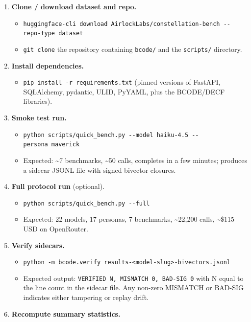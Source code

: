 \documentclass{article}
\providecommand{\tightlist}{\setlength{\itemsep}{0pt}\setlength{\parskip}{0pt}}
\begin{document}
\begin{enumerate}
\def\labelenumi{\arabic{enumi}.}
\tightlist
\item
  \textbf{Clone / download dataset and repo.}

  \begin{itemize}
  \tightlist
  \item
    \texttt{huggingface-cli\ download\ AirlockLabs/constellation-bench\ -\/-repo-type\ dataset}
  \item
    \texttt{git\ clone} the repository containing \texttt{bcode/} and
    the \texttt{scripts/} directory.
  \end{itemize}
\item
  \textbf{Install dependencies.}

  \begin{itemize}
  \tightlist
  \item
    \texttt{pip\ install\ -r\ requirements.txt} (pinned versions of
    FastAPI, SQLAlchemy, pydantic, ULID, PyYAML, plus the BCODE/DECF
    libraries).
  \end{itemize}
\item
  \textbf{Smoke test run.}

  \begin{itemize}
  \tightlist
  \item
    \texttt{python\ scripts/quick\_bench.py\ -\/-model\ haiku-4.5\ -\/-persona\ maverick}
  \item
    Expected: \textasciitilde7 benchmarks, \textasciitilde50 calls,
    completes in a few minutes; produces a sidecar JSONL file with
    signed bivector closures.
  \end{itemize}
\item
  \textbf{Full protocol run} (optional).

  \begin{itemize}
  \tightlist
  \item
    \texttt{python\ scripts/quick\_bench.py\ -\/-full}
  \item
    Expected: 22 models, 17 personas, 7 benchmarks,
    \textasciitilde22,200 calls, \textasciitilde\$115 USD on OpenRouter.
  \end{itemize}
\item
  \textbf{Verify sidecars.}

  \begin{itemize}
  \tightlist
  \item
    \texttt{python\ -m\ bcode.verify\ results-\textless{}model-slug\textgreater{}-bivectors.jsonl}
  \item
    Expected output: \texttt{VERIFIED\ N,\ MISMATCH\ 0,\ BAD-SIG\ 0}
    with N equal to the line count in the sidecar file. Any non-zero
    MISMATCH or BAD-SIG indicates either tampering or replay drift.
  \end{itemize}
\item
  \textbf{Recompute summary statistics.}


\end{enumerate}
\end{document}

